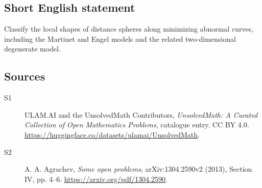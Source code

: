 \documentclass[11pt]{article}
\begin{document}
\subsection{Short English statement}
Classify the local shapes of distance spheres along minimizing abnormal curves, including the Martinet and Engel models and the related two-dimensional degenerate model.
\subsection{Sources}
\begin{description}
\item[\hypertarget{source:statement:1}{S1}] ULAM.AI and the UnsolvedMath Contributors, \emph{UnsolvedMath: A Curated Collection of Open Mathematics Problems}, catalogue entry. CC BY 4.0. \url{https://huggingface.co/datasets/ulamai/UnsolvedMath}.
\item[\hypertarget{source:statement:2}{S2}] A. A. Agrachev, \emph{Some open problems}, arXiv:1304.2590v2 (2013), Section IV, pp. 4--6. \url{https://arxiv.org/pdf/1304.2590}.
\end{description}
\label{end:statement}
\end{document}
